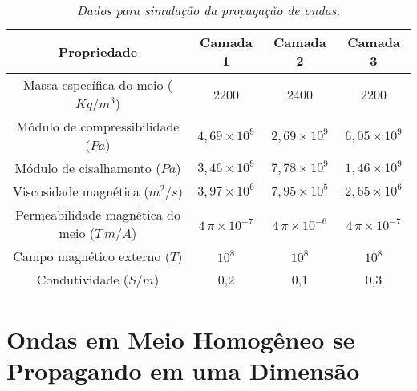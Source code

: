 \begin{table}
\begin{center}
\begin{tabular}{|c|c|c|c|}
\hline 
Propriedade & Camada 1 & Camada 2 & Camada 3 \\ 
\hline 
Massa espec\'ifica do meio ($Kg/m^3$) & 2200 & 2400 & 2200 \\ 
\hline 
M\'odulo de compressibilidade ($Pa$) & $4,69\times 10^9$ & $2,69\times 10^9$ & $6,05\times 10^9$ \\ 
\hline 
M\'odulo de cisalhamento ($Pa$) & $3,46\times 10^9$ & $7,78\times 10^9$ & $1,46\times 10^9$ \\ 
\hline 
Viscosidade magn\'etica ($m^2/s$) & $3,97\times 10^{6}$ & $7,95\times 10^{5}$ & $2,65\times 10^{6}$ \\ 
\hline 
Permeabilidade magn\'etica do meio ($T\,m/A$) & $4\,\pi\times 10^{-7}$ & $4\,\pi\times 10^{-6}$ & $4\,\pi\times 10^{-7}$ \\ 
\hline 
Campo magn\'etico externo ($T$) & $10^{8}$ & $10^{8}$ & $10^{8}$ \\ 
\hline 
Condutividade ($S/m$) & 0,2 & 0,1 & 0,3 \\
\hline
\end{tabular}
\end{center}
\caption{\textit{Dados para simula\c{c}\~ao da propaga\c{c}\~ao de ondas.}}
\label{tab.dados_propagacao}
\end{table}

\section{Ondas em Meio Homog\^eneo se Propagando em uma Dimens\~ao}\label{sec.prop_homo_1D}
